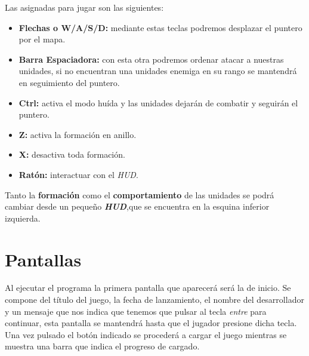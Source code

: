 Las asignadas para jugar son las siguientes:
\begin{itemize}
	\item \textbf{Flechas o W/A/S/D:} mediante estas teclas podremos desplazar el puntero por el mapa.
	\item \textbf{Barra Espaciadora:} con esta otra podremos ordenar atacar a nuestras unidades,
									  si no encuentran una unidades enemiga en su rango se mantendrá
									  en seguimiento del puntero.
	\item \textbf{Ctrl:} activa el modo huída y las unidades dejarán de combatir y seguirán el
					  puntero.	
	\item \textbf{Z:} activa la formación en anillo.									  
	\item \textbf{X:} desactiva toda formación.
	\item \textbf{Ratón:} interactuar con el \textit{HUD}.
\end{itemize}

Tanto la \textbf{formación} como el \textbf{comportamiento} de las unidades se podrá cambiar desde un
pequeño \textbf{\textit{HUD}},que se encuentra en la esquina inferior izquierda.

\section{Pantallas}
Al ejecutar el programa la primera pantalla que aparecerá será la de 
inicio. Se compone del título del juego, la fecha de lanzamiento,
el nombre del desarrollador y un mensaje que nos indica que tenemos que pulsar al tecla
\textit{entre} para continuar, esta pantalla se mantendrá hasta que el jugador presione
dicha tecla.\\
Una vez pulsado el botón indicado se procederá a cargar el juego mientras se muestra
una barra que indica el progreso de cargado.

